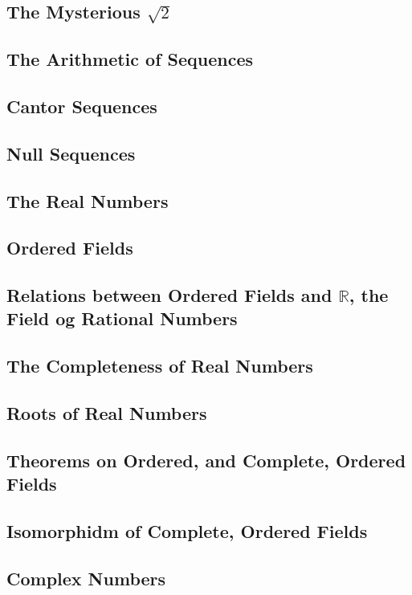 \documentclass{book}
\theoremstyle{definition}
\theoremstyle{remark}
\newcommand{\bb}[1]{\mathbb{#1}}
\begin{document}
\subsection{The Mysterious $\sqrt{2}$}
\subsection{The Arithmetic of Sequences}
\subsection{Cantor Sequences}
\subsection{Null Sequences}
\subsection{The Real Numbers}
\subsection{Ordered Fields}
\subsection{Relations between Ordered Fields and $\bb{R}$, the Field og Rational Numbers}
\subsection{The Completeness of Real Numbers}
\subsection{Roots of Real Numbers}
\subsection{Theorems on Ordered, and Complete, Ordered Fields}
\subsection{Isomorphidm of Complete, Ordered Fields}
\subsection{Complex Numbers}
\end{document}
